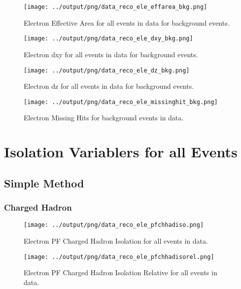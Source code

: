 \documentclass[11pt]{book}
\begin{document}
\begin{figure}[htb]
\centering
\texttt{[image: ../output/png/data\_reco\_ele\_effarea\_bkg.png]}
\caption{Electron Effective Area for all events in data for background events.}
\label{fig:data_ele_effarea_bkg}
\end{figure}

\begin{figure}[htb]
\centering
\texttt{[image: ../output/png/data\_reco\_ele\_dxy\_bkg.png]}
\caption{Electron dxy for all events in data for background events.}
\label{fig:data_ele_dxy_bkg}
\end{figure}

\begin{figure}[htb]
\centering
\texttt{[image: ../output/png/data\_reco\_ele\_dz\_bkg.png]}
\caption{Electron dz for all events in data for background events.}
\label{fig:data_ele_dz_bkg}
\end{figure}

\begin{figure}[htb]
\centering
\texttt{[image: ../output/png/data\_reco\_ele\_missinghit\_bkg.png]}
\caption{Electron Missing Hits for background events in data.}
\label{fig:data_ele_missinghĩt_bkg}
\end{figure}
\clearpage


\chapter{Isolation Variablers for all Events}
\section{Simple Method}
\subsection{Charged Hadron}
\begin{figure}[htb]
\centering
\texttt{[image: ../output/png/data\_reco\_ele\_pfchhadiso.png]}
\caption{Electron PF Charged Hadron Isolation for all events in data.}
\label{fig:data_ele_pfchhadiso}
\end{figure}

\begin{figure}[htb]
\centering
\texttt{[image: ../output/png/data\_reco\_ele\_pfchhadisorel.png]}
\caption{Electron PF Charged Hadron Isolation Relative for all events in data.}
\label{fig:data_ele_pfchhadisorel}
\end{figure}
\end{document}

